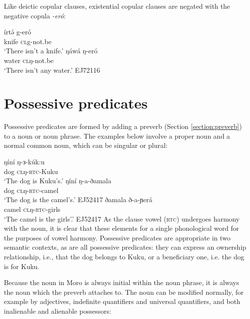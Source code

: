  
Like deictic copular clauses, existential copular clauses are negated with the negative copula \textit{-eró}:

\ea	
	\ea \gll	írtə́	g-eró\\
				knife 	\textsc{cl}g-not.be\\
		\glt 	‘There isn't a knife.’
	\ex \gll 	ŋáwá ŋ-eró\\
				water \textsc{cl}ŋ-not.be\\
		\glt	`There isn't any water.' \hfill EJ72116
\z \z 

\section{Possessive predicates}\label{section:posspred}

Possessive predicates are formed by adding a preverb (Section \ref{section:preverb}) to a noun or noun phrase. The examples below involve a proper noun and a normal common noun, which can be singular or plural:

\ea 
\ea \gll  	ŋíní ŋ-ɜ-kúk:u\\
			dog \textsc{cl}ŋ-\textsc{rtc}-Kuku\\
	\glt 	`The dog is Kuku's.'
\ex	\gll	ŋíní ŋ-a-ðamala\\
			dog \textsc{cl}ŋ-\textsc{rtc}-camel\\
	\glt	`The dog is the camel's.' \hfill EJ52417
\ex	\gll	ðamala ð-a-ɲerá\\
			camel \textsc{cl}ŋ-\textsc{rtc}-girls\\
	\glt	`The camel is the girls'.' \hfill EJ52417
	\z 
\z 
As the clause vowel (\textsc{rtc}) undergoes harmony with the noun, it is clear that these elements for a single phonological word for the purposes of vowel harmony. Possessive predicates are appropriate in two semantic contexts, as are all possessive predicates: they can express an ownership relationship, i.e., that the dog belongs to Kuku, or a beneficiary one, i.e. the dog is for Kuku.

Because the noun in Moro is always initial within the noun phrase, it is always the noun which the preverb attaches to. The noun can be modified normally, for example by adjectives, indefinite quantifiers and universal quantifiers, and both inalienable and alienable possessors: %


